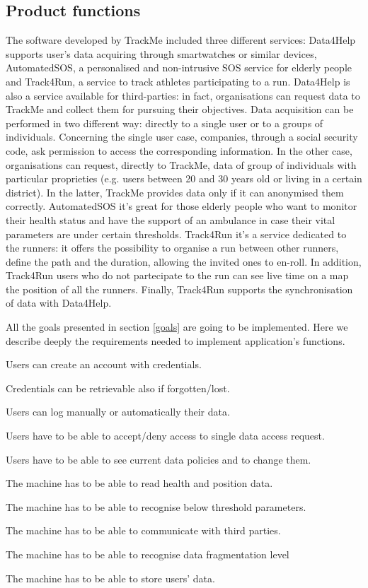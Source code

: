 \documentclass{article}
\begin{document}
\subsection{Product functions}
The software developed by TrackMe included three different services:
Data4Help supports user's data acquiring through smartwatches or 
similar devices, AutomatedSOS, a personalised and non-intrusive SOS 
service for elderly people and Track4Run, a service to track athletes 
participating to a run.
Data4Help is also a service available for third-parties: in fact, 
organisations can request data to TrackMe and collect them for 
pursuing their objectives.
Data acquisition can be performed in two different way: directly to a
single user or to a groups of individuals.
Concerning the single user case, companies, through a social security
code, ask permission to access the corresponding information. 
In the other case, organisations can request, directly to TrackMe,
data of group of individuals with particular proprieties (e.g. users 
between 20 and 30 years old or living in a certain district).
In the latter, TrackMe provides data only if it can anonymised them
correctly.
AutomatedSOS it’s great for those elderly people who want to monitor 
their health status and have the support of an ambulance in case their
vital parameters are under certain thresholds.
Track4Run it’s a service dedicated to the runners: it offers the 
possibility to organise a run between other runners, define the path 
and the duration, allowing the invited ones to en-roll. In addition, 
Track4Run users who do not partecipate to the run can see live time 
on a map the position of all the runners. 
Finally, Track4Run supports the synchronisation of data with 
Data4Help.

All the goals presented in section \ref{goals} are going to be 
implemented. Here we describe deeply the requirements needed to
implement application's functions.
	
\begin{enumerate}[label={[R\arabic*]}]
    	\item Users can create an account with credentials.
    	\item Credentials can be retrievable also if forgotten/lost.
    	\item Users can log manually or automatically their data.
    	\item Users have to be able to accept/deny access to single data access request.
    	\item Users have to be able to see current data policies and to change them.
    	\item The machine has to be able to read health and position data.
		\item The machine has to be able to recognise below threshold parameters.
		\item The machine has to be able to communicate with third parties.
		\item The machine has to be able to recognise data fragmentation level 
		\item The machine has to be able to store users’ data. 


\end{enumerate}
\end{document}
